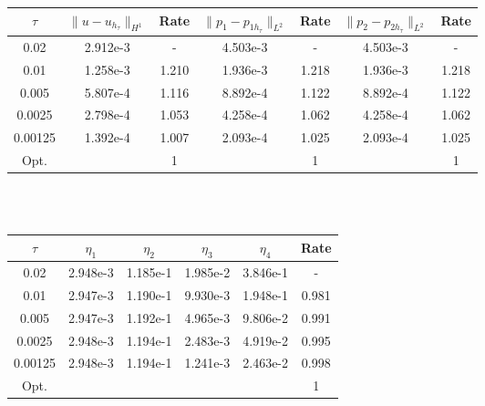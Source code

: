 \begin{center} 
\centering
\small
\begin{tabular}{c|c|c|c|c|c|c}
$\tau$ & $\|u-u_{h_{\tau}}\|_{H^1}$ & Rate & $\|p_1-p_{1h_{\tau}}\|_{L^2}$ & Rate & $\|p_2-p_{2h_{\tau}}\|_{L^2}$ & Rate \\\hline
0.02   	& 2.912e-3 & -     & 4.503e-3 & -     & 4.503e-3 &  -    \\
0.01   	& 1.258e-3 & 1.210 & 1.936e-3 & 1.218 & 1.936e-3 & 1.218 \\
0.005  	& 5.807e-4 & 1.116 & 8.892e-4 & 1.122 & 8.892e-4 & 1.122 \\
0.0025  & 2.798e-4 & 1.053 & 4.258e-4 & 1.062 & 4.258e-4 & 1.062 \\
0.00125 & 1.392e-4 & 1.007 & 2.093e-4 & 1.025 & 2.093e-4 & 1.025 \\ \hline
Opt. & & 1 & & 1  & & 1
\end{tabular}
\normalsize
{} \label{tab:bb_default_transfer_time_error}
\end{center}
\mbox{}\\ \\
\begin{center}
\centering
\begin{tabular}{c|c|c|c|c|c}
$\tau$ & $\eta_1$ & $\eta_2$ & $\eta_3$ & $\eta_4$ & Rate\\\hline
0.02    & 2.948e-3 & 1.185e-1 & 1.985e-2 & 3.846e-1 & -    \\
0.01    & 2.947e-3 & 1.190e-1 & 9.930e-3 & 1.948e-1 & 0.981\\
0.005   & 2.947e-3 & 1.192e-1 & 4.965e-3 & 9.806e-2 & 0.991\\
0.0025  & 2.948e-3 & 1.194e-1 & 2.483e-3 & 4.919e-2 & 0.995\\
0.00125 & 2.948e-3 & 1.194e-1 & 1.241e-3 & 2.463e-2 & 0.998\\\hline
Opt. & & & & & 1
\end{tabular}
  \label{tab:bb_default_transfer_time_est}
\end{center}
\mbox{}\\ \\ \\
